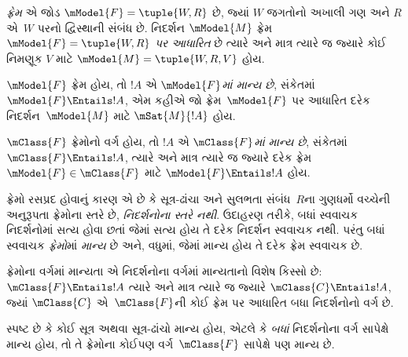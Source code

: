 \begingroup
\makeatletter{}\makeatother


\label{guunit:OLP-0422}


\begin{defn}
  \emph{ફ્રેમ} એ જોડ $\mModel{F} = \tuple{W,R}$ છે, જ્યાં
  $W$ જગતોનો અખાલી ગણ અને $R$ એ~$W$ પરનો
  દ્વિસ્થાની સંબંધ છે. નિદર્શન $\mModel{M}$ ફ્રેમ
  $\mModel{F} = \tuple{W,R}$ \emph{પર આધારિત} છે
  ત્યારે અને માત્ર ત્યારે જ જ્યારે કોઈ નિમણૂક $V$
  માટે $\mModel{M} = \tuple{W, R, V}$ હોય.
\end{defn}

\begin{defn}
  $\mModel{F}$ ફ્રેમ હોય, તો $!A$ એ
  \emph{$\mModel{F}$માં માન્ય છે}, સંકેતમાં
  $\mModel{F} \Entails !A$, એમ કહીએ જો
  ફ્રેમ~$\mModel{F}$ પર આધારિત દરેક નિદર્શન~$\mModel{M}$
  માટે $\mSat{M}{!A}$ હોય.
  
  $\mClass{F}$ ફ્રેમોનો વર્ગ હોય, તો $!A$ એ
  \emph{$\mClass{F}$માં માન્ય છે}, સંકેતમાં
  $\mClass{F} \Entails !A$, ત્યારે અને માત્ર ત્યારે જ
  જ્યારે દરેક ફ્રેમ~$\mModel{F} \in \mClass{F}$ માટે
  $\mModel{F} \Entails !A$ હોય.
\end{defn}

ફ્રેમો રસપ્રદ હોવાનું કારણ એ છે કે સૂત્ર-ઢાંચા અને
સુલભતા સંબંધ~$R$ના ગુણધર્મો વચ્ચેની અનુરૂપતા
ફ્રેમોના સ્તરે છે, \emph{નિદર્શનોના સ્તરે નથી}.
ઉદાહરણ તરીકે,  બધાં સ્વવાચક નિદર્શનોમાં
સત્ય હોવા છતાં જેમાં  સત્ય હોય તે દરેક
નિદર્શન સ્વવાચક નથી. પરંતુ  બધાં સ્વવાચક
\emph{ફ્રેમો}માં \emph{માન્ય} છે અને, વધુમાં, જેમાં
 માન્ય હોય તે દરેક ફ્રેમ સ્વવાચક છે.

\begin{rem}
ફ્રેમોના વર્ગમાં માન્યતા એ નિદર્શનોના વર્ગમાં
માન્યતાનો વિશેષ કિસ્સો છે: $\mClass{F} \Entails !A$
ત્યારે અને માત્ર ત્યારે જ જ્યારે
$\mClass{C} \Entails !A$, જ્યાં $\mClass{C}$
એ~$\mClass{F}$ની કોઈ ફ્રેમ પર આધારિત બધા
નિદર્શનોનો વર્ગ છે.

સ્પષ્ટ છે કે કોઈ સૂત્ર અથવા સૂત્ર-ઢાંચો
માન્ય હોય, એટલે કે \emph{બધાં} નિદર્શનોના વર્ગ
સાપેક્ષે માન્ય હોય, તો તે ફ્રેમોના કોઈપણ
વર્ગ~$\mClass{F}$ સાપેક્ષે પણ માન્ય છે.
\end{rem}
\endgroup

\begingroup
\makeatletter{}\makeatother


\label{guunit:OLP-0423}


